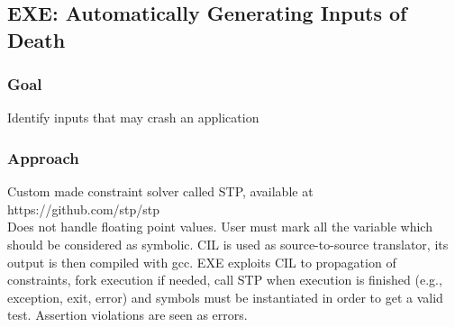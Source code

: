 \documentclass[10pt, a4paper]{article}
\begin{document}
\subsection{\cite{EXE-CCS06} EXE: Automatically Generating Inputs of Death} 

\subsubsection{Goal}
Identify inputs that may crash an application

\subsubsection{Approach}
Custom made constraint solver called STP, available at https://github.com/stp/stp\\


Does not handle floating point values. User must mark all the variable which should be considered as symbolic. CIL is used as source-to-source translator, its output is then compiled with gcc. EXE exploits CIL to propagation of constraints, fork execution if needed,  call STP when execution is finished (e.g., exception, exit, error) and symbols must be instantiated in order to get a valid test. Assertion violations are seen as errors.
\end{document}
